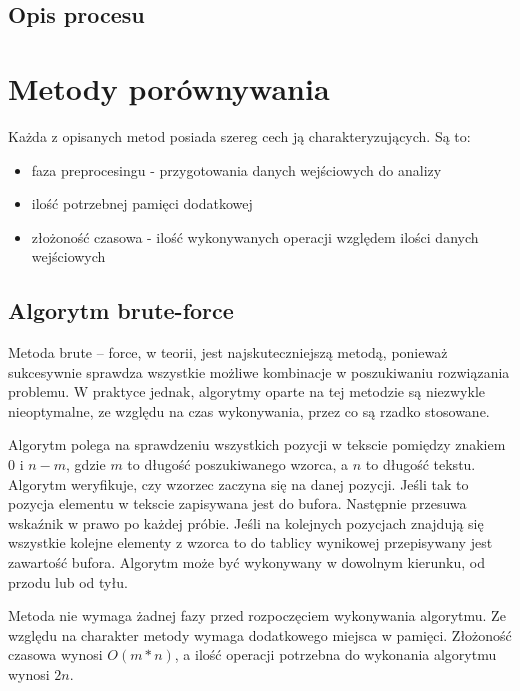 \documentclass[a4paper,12pt]{article}
\begin{document}
\subsection{Opis procesu}


\newpage

\section{Metody porównywania}

Każda z opisanych metod posiada szereg cech ją charakteryzujących. Są to:
\begin{itemize}
\item faza preprocesingu - przygotowania danych wejściowych do analizy
\item ilość potrzebnej pamięci dodatkowej
\item złożoność czasowa - ilość wykonywanych operacji względem ilości danych wejściowych
\end{itemize}

\subsection{Algorytm brute-force}

Metoda brute -- force, w teorii, jest najskuteczniejszą metodą, ponieważ sukcesywnie sprawdza wszystkie możliwe kombinacje w poszukiwaniu rozwiązania problemu. W praktyce jednak, algorytmy oparte na tej metodzie są niezwykle nieoptymalne, ze względu na czas wykonywania, przez co są rzadko stosowane.

Algorytm polega na sprawdzeniu wszystkich pozycji w tekscie pomiędzy znakiem $0$ i $n-m$, gdzie $m$ to długość poszukiwanego wzorca, a $n$ to długość tekstu. Algorytm weryfikuje, czy wzorzec zaczyna się na danej pozycji. Jeśli tak to pozycja elementu w tekscie zapisywana jest do bufora. Następnie przesuwa wskaźnik w prawo po każdej próbie. Jeśli na kolejnych pozycjach znajdują się wszystkie kolejne elementy z wzorca to do tablicy wynikowej przepisywany jest zawartość bufora. Algorytm może być wykonywany w dowolnym kierunku, od przodu lub od tyłu.

Metoda nie wymaga żadnej fazy przed rozpoczęciem wykonywania algorytmu. Ze względu na charakter metody wymaga dodatkowego miejsca w pamięci. Złożoność czasowa wynosi $O(m*n)$, a ilość operacji potrzebna do wykonania algorytmu wynosi $2n$.
\end{document}
